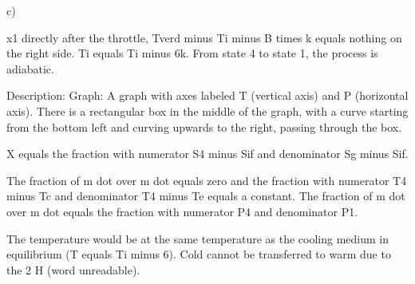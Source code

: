 c) 

x1 directly after the throttle, Tverd minus Ti minus B times k equals nothing on the right side. 
Ti equals Ti minus 6k.
From state 4 to state 1, the process is adiabatic.

Description:
Graph: A graph with axes labeled T (vertical axis) and P (horizontal axis). There is a rectangular box in the middle of the graph, with a curve starting from the bottom left and curving upwards to the right, passing through the box.

X equals the fraction with numerator S4 minus Sif and denominator Sg minus Sif.

The fraction of m dot over m dot equals zero and the fraction with numerator T4 minus Tc and denominator T4 minus Te equals a constant.
The fraction of m dot over m dot equals the fraction with numerator P4 and denominator P1.

The temperature would be at the same temperature as the cooling medium in equilibrium (T equals Ti minus 6).
Cold cannot be transferred to warm due to the 2 H (word unreadable).